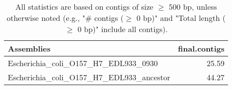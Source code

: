 \documentclass[12pt,a4paper]{article}
\begin{document}
\begin{table}[ht]
\begin{center}
\caption{All statistics are based on contigs of size $\geq$ 500 bp, unless otherwise noted (e.g., "\# contigs ($\geq$ 0 bp)" and "Total length ($\geq$ 0 bp)" include all contigs).}
\begin{tabular}{|l*{1}{|r}|}
\hline
Assemblies & final.contigs \\ \hline
Escherichia\_coli\_O157\_H7\_EDL933\_0930 & 25.59 \\ \hline
Escherichia\_coli\_O157\_H7\_EDL933\_ancestor & 44.27 \\ \hline
\end{tabular}
\end{center}
\end{table}
\end{document}
